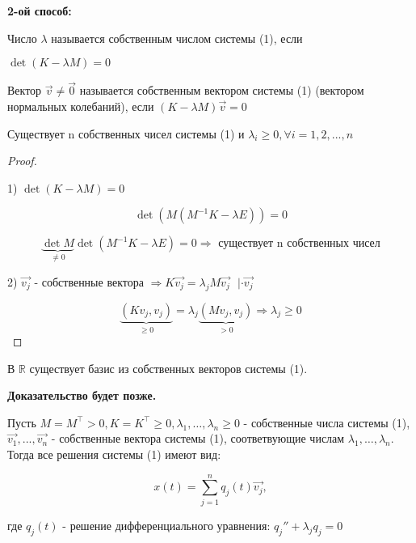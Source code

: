 \documentclass[12pt, a4paper]{report}
\begin{document}
\textbf{2-ой способ:}

\begin{definition}
    Число \( \lambda     \)  называется собственным числом системы (1), если
    
    \( \det (K -\lambda M ) = 0 \) 
\end{definition}

\begin{definition}
    Вектор \( \vec{v }  \neq \vec{0}  \)  называется собственным вектором системы (1) (вектором нормальных колебаний), если \( (K -\lambda M ) \vec{v } = 0 \) 
\end{definition}

\begin{theorem}
    Существует n собственных чисел системы (1) и \( \lambda_{i } \geq 0 , \forall  i = 1,2,...,n \) 
\end{theorem}

\begin{proof}
\[  \]

1) \( \det (K -\lambda M )  = 0 \) 

\[ \det (M(M^{-1} K - \lambda E )) = 0 \] 

\[ \underbrace{\det M}_{ \neq 0} \det (M^{-1 } K - \lambda E ) = 0 \Rightarrow \text{ существует n собственных чисел}  \] 

2) \( \vec{v_j}  \)  - собственные вектора \( \Rightarrow K \vec{v_j} = \lambda_j M \vec{v_j} \text{ } | \cdot \vec{v_j}   \)  

\[ \underbrace{(K v_{j }  , v_j)}_{\geq 0}  = \lambda_j \underbrace{(M v_j ,v_j)}_{>0} \Rightarrow \lambda_j \geq 0  \] 
\end{proof}

\begin{theorem}
    В \( \mathbb{R} \)  существует базис из собственных векторов системы (1).
\end{theorem}

\textbf{Доказательство будет позже.} 

\begin{theorem}
    Пусть  \( M = M^{\top} > 0 , K =K ^{\top} \geq 0 , \lambda_1, \ldots, \lambda_n \geq 0 \)  - собственные числа системы (1), \( \vec{v_1 },..., \vec{v_n}   \)  - собственные вектора системы (1), соответвующие числам \( \lambda_1, \ldots, \lambda_n \). Тогда все решения системы (1)  имеют вид: 

    \[ x(t) = \sum_{j=1} ^{n } q_j (t)\vec{v_j},   \] 

    где \( q_j(t) \)  - решение дифференциального уравнения: \( q_j '' + \lambda_j q_j = 0 \) 
\end{theorem}
\end{document}
